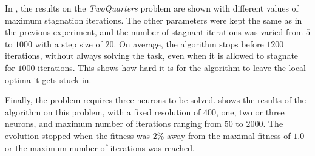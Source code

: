 In , the results on the \textit{TwoQuarters} problem are shown with different values of maximum stagnation iterations. The other parameters were kept the same as in the previous
experiment, and the number of stagnant iterations was varied from $5$ to $1000$ with a step size of $20$. On average, the algorithm stops before $1200$ iterations, without always solving the task,
even when it is allowed to stagnate for $1000$ iterations. This shows how hard it is for the algorithm to leave the local optima it gets stuck in.

Finally, the  problem requires three neurons to be solved.  shows the results of the algorithm on this problem, with a fixed resolution of $400$, one, two
or three neurons, and maximum number of iterations ranging from $50$ to $2000$. The evolution stopped when the fitness was $2\%$ away from the maximal fitness of $1.0$ or the maximum number of
iterations was reached.

